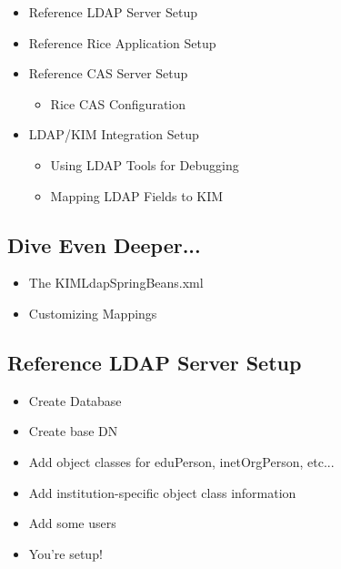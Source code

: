 \documentclass[12pt,notitlepage]{article}
\begin{document}
\begin{s5presentation}
\begin{s5slide}
    \begin{itemize}
      \item Reference LDAP Server Setup
      \item Reference Rice Application Setup
      \item Reference CAS Server Setup
        \begin{itemize}
        \item Rice CAS Configuration
        \end{itemize}
      \item LDAP/KIM Integration Setup
        \begin{itemize}
          \item Using LDAP Tools for Debugging
          \item Mapping LDAP Fields to KIM
        \end{itemize}
      \end{itemize}
    \W \end{s5slide}

%
%
  \W \begin{s5slide}
    \section{Dive Even Deeper...}

    \begin{itemize}
    \item The KIMLdapSpringBeans.xml
    \item Customizing Mappings
      \end{itemize}
    \W \end{s5slide}

%
%
  \W \begin{s5slide}
    \section{Reference LDAP Server Setup}
    \begin{itemize}
      \item Create Database
      \item Create base DN
      \item Add object classes for eduPerson, inetOrgPerson, etc...
      \item Add institution-specific object class information
      \item Add some users
      \item You're setup!
    \end{itemize}


\end{s5slide}
\end{s5presentation}
\end{document}
